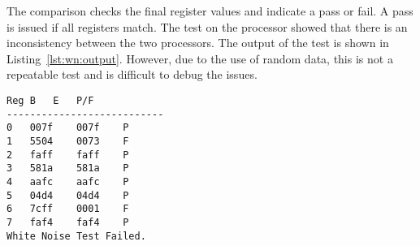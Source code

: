 The comparison checks the final register values and indicate a pass or fail. 
A pass is issued if all registers match. 
The test on the processor showed that there is an inconsistency between the two processors. 
The output of the test is shown in Listing~\ref{lst:wn:output}.
However, due to the use of random data, this is not a repeatable test and is difficult to debug the issues. 





\begin{lstlisting}[label=lst:wn:output,caption={Output of the white noise test}]
Reg	B	E	P/F
---------------------------
0	007f	007f	P
1	5504	0073	F
2	faff	faff	P
3	581a	581a	P
4	aafc	aafc	P
5	04d4	04d4	P
6	7cff	0001	F
7	faf4	faf4	P
White Noise Test Failed.
\end{lstlisting}

